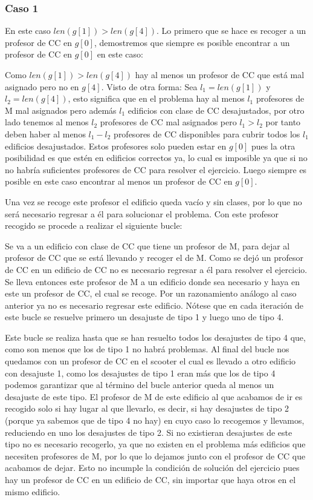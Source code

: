 \documentclass[11pt]{article}
\begin{document}
    \subsubsection{Caso 1}
    En este caso $len(g[1]) > len(g[4])$. Lo primero que se hace es recoger a un profesor de CC en $g[0]$, demostremos que siempre
    es posible encontrar a un profesor de CC en $g[0]$ en este caso:

    Como $len(g[1]) > len(g[4])$ hay al menos un profesor de CC que está mal asignado pero no en $g[4]$. Visto de otra forma:
    Sea $l_1 = len(g[1])$ y $l_2 = len(g[4])$, esto significa que en el problema hay al menos $l_1$ profesores de M mal asignados
    pero además $l_1$ edificios con clase de CC desajustados, por otro lado tenemos al menos $l_2$ profesores de CC mal asignados pero
    $l_1 > l_2$ por tanto deben haber al menos $l_1 - l_2$ profesores de CC disponibles para cubrir todos los $l_1$ edificios desajustados.
    Estos profesores solo pueden estar en $g[0]$ pues la otra posibilidad es que estén en edificios correctos ya, lo cual es imposible
    ya que si no no habría suficientes profesores de CC para resolver el ejercicio. Luego siempre es posible en este caso encontrar al
    menos un profesor de CC en $g[0]$.

    Una vez se recoge este profesor el edificio queda vacío y sin clases, por lo que no será necesario regresar a él para solucionar el
    problema. Con este profesor recogido se procede a realizar el siguiente bucle:

    Se va a un edificio con clase de CC que tiene un profesor de M, para dejar al profesor de CC que se está llevando y recoger el de M.
    Como se dejó un profesor de CC en un edificio de CC no es necesario regresar a él para resolver el ejercicio. Se lleva entonces este 
    profesor de M a un edificio donde sea necesario y haya en este un profesor de CC, el cual se recoge. Por un razonamiento análogo al 
    caso anterior ya no es necesario regresar este edificio. Nótese que en cada iteración de este bucle se resuelve primero un desajuste 
    de tipo 1 y luego uno de tipo 4.

    Este bucle se realiza hasta que se han resuelto todos los desajustes de tipo 4 que, como son menos que los de tipo 1 no habrá
    problemas. Al final del bucle nos quedamos con un profesor de CC en el scooter el cual es llevado a otro edificio con desajuste
    1, como los desajustes de tipo 1 eran más que los de tipo 4 podemos garantizar que al término del bucle anterior queda al menos
    un desajuste de este tipo. El profesor de M de este edificio al que acabamos de ir es recogido solo si hay lugar al que llevarlo,
    es decir, si hay desajustes de tipo 2 (porque ya sabemos que de tipo 4 no hay) en cuyo caso lo recogemos y llevamos, reduciendo
    en uno los desajustes de tipo 2. Si no existieran desajustes de este tipo no es necesario recogerlo, ya que no existen en el problema
    más edificios que necesiten profesores de M, por lo que lo dejamos junto con el profesor de CC que acabamos de dejar. Esto no incumple
    la condición de solución del ejercicio pues hay un profesor de CC en un edificio de CC, sin importar que haya otros en el mismo edificio.
\end{document}
